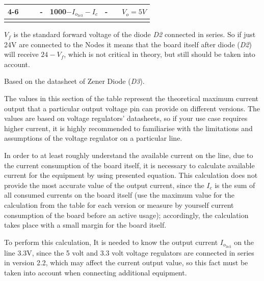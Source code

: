 \documentclass[10pt]{datasheet}
\begin{document}
\begin{table}[h]
\begin{threeparttable}
\begin{tabularx}{\textwidth}{l c | c| c c c | c | X}
    \cline{4-6}
    \cline{8-8}
    \multicolumn{1}{l|}{}& & & - & 1000$-I_{o_{3v3}}-I_c$\tnote{5}& - & & $V_o=5V$\tnote{\cite{ref6}}
    \\
    \hline
    \thickhline
\end{tabularx}
\begin{tablenotes}
\item[1] {$V_f$ is the standard forward voltage of the diode \textit{D2} connected in series. So if just 24V are connected to the Nodes it means that the board itself after diode (\textit{D2}) will receive $24-V_f$, which is not critical in theory, but still should be taken into account.}
\item[2]{Based on the datasheet of Zener Diode (\textit{D3})\cite{ref1}.}
\item[3]{The values in this section of the table represent the theoretical maximum current output that a particular output voltage pin can provide on different versions. The values are based on voltage regulators' datasheets, so if your use case requires higher current, it is highly recommended to familiarise with the limitations and assumptions of the voltage regulator on a particular line.} 
\item[4]{In order to at least roughly understand the available current on the line, due to the current consumption of the board itself, it is necessary to calculate available current for the equipment by using presented equation. This calculation does not provide the most accurate value of the output current, since the $I_c$ is the sum of all consumed currents on the board itself (use the maximum value for the calculation from the table for each version or measure by yourself current consumption of the board before an active usage); accordingly, the calculation takes place with a small margin for the board itself.}
\item[5]{To perform this calculation, It is needed to know the output current $I_{o_{3v3}}$ on the line 3.3V, since the 5 volt and 3.3 volt voltage regulators are connected in series in version 2.2, which may affect the current output value, so this fact must be taken into account when connecting additional equipment.}
\end{tablenotes}
\end{threeparttable}
\end{table}
\newpage
\end{document}

